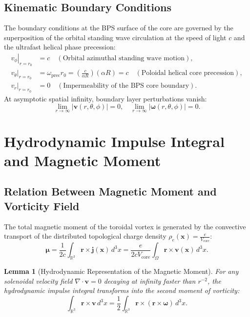 \documentclass[12pt,a4paper]{article}
\newtheorem{lemma}{Lemma}
\begin{document}
	\subsection{Kinematic Boundary Conditions}
	The boundary conditions at the BPS surface of the core are governed by the superposition of the orbital standing wave circulation at the speed of light $c$ and the ultrafast helical phase precession:
	\begin{align}
		\left. v_\phi \right|_{r = r_0} &= c \quad (\text{Orbital azimuthal standing wave motion}), \\
		\left. v_\theta \right|_{r = r_0} &= \omega_{\text{prec}} r_0 = \left(\frac{c}{\alpha R}\right) (\alpha R) = c \quad (\text{Poloidal helical core precession}), \\
		\left. v_r \right|_{r = r_0} &= 0 \quad (\text{Impermeability of the BPS core boundary}).
	\end{align}
	At asymptotic spatial infinity, boundary layer perturbations vanish:
	\begin{equation}
		\lim_{r \to \infty} |\mathbf{v}(r, \theta, \phi)| = 0, \quad \lim_{r \to \infty} |\boldsymbol{\omega}(r, \theta, \phi)| = 0.
	\end{equation}
	
	\section{Hydrodynamic Impulse Integral and Magnetic Moment}
	
	\subsection{Relation Between Magnetic Moment and Vorticity Field}
	The total magnetic moment of the toroidal vortex is generated by the convective transport of the distributed topological charge density $\rho_e(\mathbf{x}) = \frac{e}{V_{\text{core}}}$:
	\begin{equation}
		\boldsymbol{\mu} = \frac{1}{2c} \int_{\mathbb{R}^3} \mathbf{r} \times \mathbf{j}(\mathbf{x}) \, d^3x = \frac{e}{2c V_{\text{core}}} \int_{\Omega} \mathbf{r} \times \mathbf{v}(\mathbf{x}) \, d^3x.
	\end{equation}
	
	\begin{lemma}[Hydrodynamic Representation of the Magnetic Moment]
		For any solenoidal velocity field $\nabla \cdot \mathbf{v} = 0$ decaying at infinity faster than $r^{-2}$, the hydrodynamic impulse integral transforms into the second moment of vorticity:
		\begin{equation}
			\int_{\mathbb{R}^3} \mathbf{r} \times \mathbf{v} \, d^3x = \frac{1}{2} \int_{\mathbb{R}^3} \mathbf{r} \times (\mathbf{r} \times \boldsymbol{\omega}) \, d^3x.
		\end{equation}
	\end{lemma}
	
\end{document}
